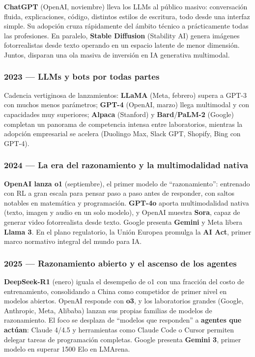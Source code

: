 \documentclass[
  letterpaper,
  DIV=11,
  numbers=noendperiod]{scrartcl}
\begin{document}
\textbf{ChatGPT} (OpenAI, noviembre) lleva los LLMs al público masivo:
conversación fluida, explicaciones, código, distintos estilos de
escritura, todo desde una interfaz simple. Su adopción cruza rápidamente
del ámbito técnico a prácticamente todas las profesiones. En paralelo,
\textbf{Stable Diffusion} (Stability AI) genera imágenes fotorrealistas
desde texto operando en un espacio latente de menor dimensión. Juntos,
disparan una ola masiva de inversión en IA generativa multimodal.

\subsubsection{2023 --- LLMs y bots por todas
partes}\label{llms-y-bots-por-todas-partes}

Cadencia vertiginosa de lanzamientos: \textbf{LLaMA} (Meta, febrero)
supera a GPT-3 con muchos menos parámetros; \textbf{GPT-4} (OpenAI,
marzo) llega multimodal y con capacidades muy superiores;
\textbf{Alpaca} (Stanford) y \textbf{Bard}/\textbf{PaLM-2} (Google)
completan un panorama de competencia intensa entre laboratorios,
mientras la adopción empresarial se acelera (Duolingo Max, Slack GPT,
Shopify, Bing con GPT-4).

\subsubsection{2024 --- La era del razonamiento y la multimodalidad
nativa}\label{la-era-del-razonamiento-y-la-multimodalidad-nativa}

\textbf{OpenAI lanza o1} (septiembre), el primer modelo de
``razonamiento'': entrenado con RL a gran escala para pensar paso a paso
antes de responder, con saltos notables en matemática y programación.
\textbf{GPT-4o} aporta multimodalidad nativa (texto, imagen y audio en
un solo modelo), y OpenAI muestra \textbf{Sora}, capaz de generar video
fotorrealista desde texto. Google presenta \textbf{Gemini} y Meta libera
\textbf{Llama 3}. En el plano regulatorio, la Unión Europea promulga la
\textbf{AI Act}, primer marco normativo integral del mundo para IA.

\subsubsection{2025 --- Razonamiento abierto y el ascenso de los
agentes}\label{razonamiento-abierto-y-el-ascenso-de-los-agentes}

\textbf{DeepSeek-R1} (enero) iguala el desempeño de o1 con una fracción
del costo de entrenamiento, consolidando a China como competidor de
primer nivel en modelos abiertos. OpenAI responde con \textbf{o3}, y los
laboratorios grandes (Google, Anthropic, Meta, Alibaba) lanzan sus
propias familias de modelos de razonamiento. El foco se desplaza de
``modelos que responden'' a \textbf{agentes que actúan}: Claude 4/4.5 y
herramientas como Claude Code o Cursor permiten delegar tareas de
programación completas. Google presenta \textbf{Gemini 3}, primer modelo
en superar 1500 Elo en LMArena.
\end{document}
